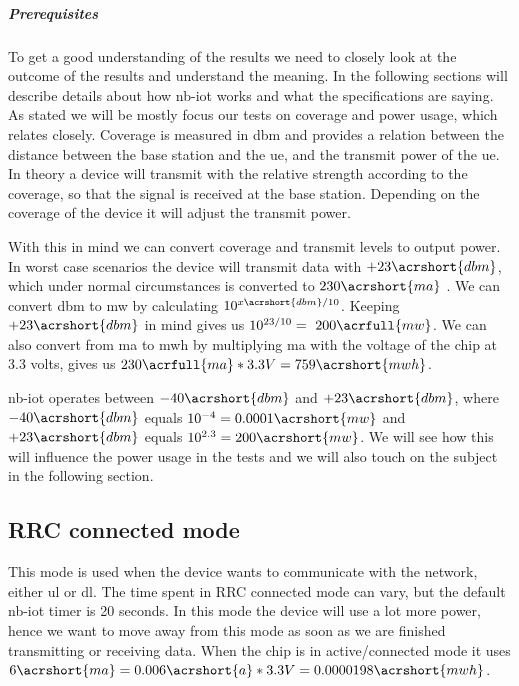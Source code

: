 \documentclass[USenglish]{ifimaster}  %
\begin{document}
\subparagraph{Prerequisites}
To get a good understanding of the results we need to closely look at the outcome of the results and understand the meaning. In the following sections will describe details about how \acrshort{nb-iot} works and what the specifications are saying. As stated we will be mostly focus our tests on coverage and power usage, which relates closely. Coverage is measured in \acrfull{dbm} and provides a relation between the distance between the base station and the \acrshort{ue}, and the transmit power of the \acrshort{ue}. In theory a device will transmit with the relative strength according to the coverage, so that the signal is received at the base station. Depending on the coverage of the device it will adjust the transmit power.

With this in mind we can convert coverage and transmit levels to output power. In worst case scenarios the device will transmit data with ${+23\acrshort{dbm}}$, which under normal circumstances is converted to ${230 \acrshort{ma}}$ \cite{datasheet:ubloxchip}. We can convert \acrshort{dbm} to \acrshort{mw} by calculating ${10^{x \acrshort{dbm} / 10}}$. Keeping ${+23 \acrshort{dbm}}$ in mind gives us ${10^{23 / 10} = ~200 \acrfull{mw}}$. We can also convert from \acrshort{ma} to \acrshort{mwh} by multiplying \acrshort{ma} with the voltage of the chip at 3.3 volts, gives us ${230\acrfull{ma} * 3.3V = 759 \acrshort{mwh}}$.

\acrshort{nb-iot} operates between ${-40 \acrshort{dbm}}$ and ${+23 \acrshort{dbm}}$, where ${-40 \acrshort{dbm}}$ equals ${10^{-4} = 0.0001 \acrshort{mw}}$ and ${+23 \acrshort{dbm}}$ equals ${10^{2.3} = 200 \acrshort{mw}}$. We will see how this will influence the power usage in the tests and we will also touch on the subject in the following section.

\subsection{RRC connected mode} \label{ssection:rrc}
This mode is used when the device wants to communicate with the network, either \acrshort{ul} or \acrshort{dl}. The time spent in RRC connected mode can vary, but the default \acrshort{nb-iot} timer is 20 seconds. In this mode the device will use a lot more power, hence we want to move away from this mode as soon as we are finished transmitting or receiving data. When the chip is in active/connected mode it uses ${6 \acrshort{ma} = 0.006 \acrshort{a} * 3.3V = 0.0000198 \acrshort{mwh}}$.
\end{document}
